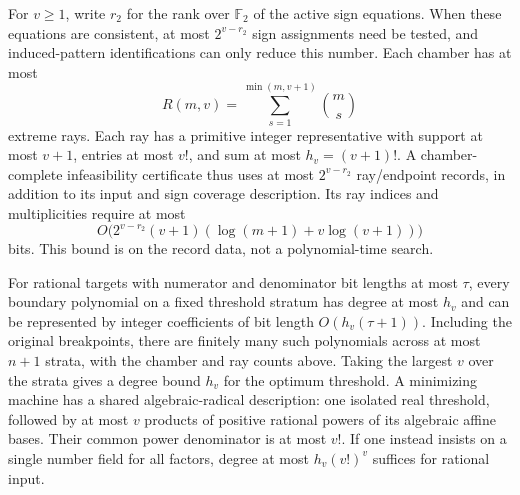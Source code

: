 \begin{proposition}
\label{prop:complexity50}
For $v\ge1$, write $r_2$ for the rank over $\mathbb F_2$ of the active
sign equations. When these equations are consistent, at most
$2^{v-r_2}$ sign assignments need be tested, and induced-pattern
identifications can only reduce this number. Each chamber has at most
\begin{equation}\label{eq:rays50}
 R(m,v)=\sum_{s=1}^{\min(m,v+1)}\binom{m}{s}
\end{equation}
extreme rays. Each ray has a primitive integer representative with
support at most $v+1$, entries at most $v!$, and sum at most
$h_v=(v+1)!$. A chamber-complete infeasibility certificate thus uses at
most $2^{v-r_2}$ ray/endpoint records, in addition to its input and sign
coverage description. Its ray indices and multiplicities require at
most
\[
 O\bigl(2^{v-r_2}(v+1)(\log(m+1)+v\log(v+1))\bigr)
\]
bits. This bound is on the record data, not a polynomial-time search.

For rational targets with numerator and denominator bit lengths at
most $\tau$, every boundary polynomial on a fixed threshold stratum
has degree at most $h_v$ and can be represented by integer coefficients
of bit length $O(h_v(\tau+1))$. Including the original breakpoints,
there are finitely many such polynomials across at most $n+1$ strata,
with the chamber and ray counts above. Taking the largest $v$ over
the strata gives a degree bound $h_v$ for the optimum threshold.
A minimizing machine has a shared algebraic-radical description:
one isolated real threshold, followed by at most $v$ products of
positive rational powers of its algebraic affine bases. Their common
power denominator is at most $v!$. If one instead insists on a single
number field for all factors, degree at most
$h_v(v!)^v$ suffices for rational input.
\end{proposition}

